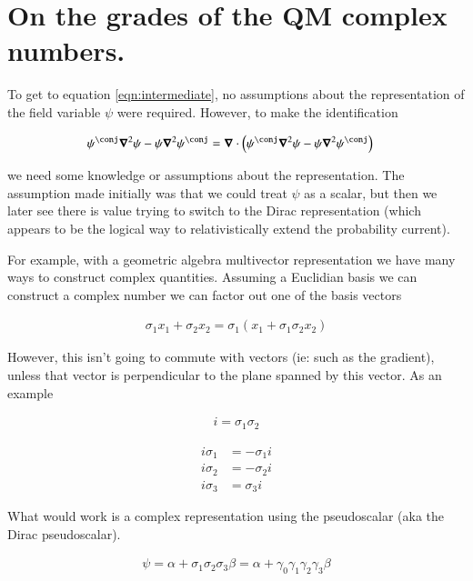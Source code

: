 \documentclass{article}
\begin{document}
\section{ On the grades of the QM complex numbers. }

To get to equation \ref{eqn:intermediate}, no assumptions about the representation of the field variable $\psi$ were
required.  However, to make the identification

\begin{align*}
\psi^\conj \spacegrad^2 \psi - \psi \spacegrad^2 \psi^\conj 
&= \spacegrad \cdot \left( \psi^\conj \spacegrad^2 \psi - \psi \spacegrad^2 \psi^\conj \right)
\end{align*}

we need some knowledge or assumptions about the representation.  The assumption made initially was that we could treat
$\psi$ as a scalar, but then we later see there is value trying to switch to the Dirac representation (which appears
to be the logical way to relativistically extend the probability current).

For example, with a geometric algebra multivector representation we have many ways to construct complex quantities.  Assuming a
Euclidian basis we can construct a complex number we can factor out one of the basis vectors

\begin{align*}
\sigma_1 x_1 + \sigma_2 x_2 = \sigma_1 ( x_1 + \sigma_1 \sigma_2 x_2 )
\end{align*}

However, this isn't going to commute with vectors (ie: such as the gradient), unless that vector is perpendicular to the
plane spanned by this vector.  As an example

\begin{align*}
i = \sigma_1 \sigma_2
\end{align*}

\begin{align*}
i \sigma_1 &= -\sigma_1 i \\
i \sigma_2 &= -\sigma_2 i \\
i \sigma_3 &=  \sigma_3 i
\end{align*}

What would work is a complex representation using the  pseudoscalar (aka the Dirac pseudoscalar).

\begin{align*}
\psi = \alpha + \sigma_1 \sigma_2 \sigma_3 \beta = \alpha + \gamma_0 \gamma_1 \gamma_2 \gamma_3 \beta 
\end{align*}



\end{document}
